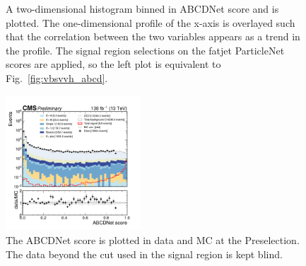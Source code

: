 \begin{figure}[htb]
    \centering
    \qquad
    \caption{
        A two-dimensional histogram binned in ABCDNet score and \detajj is plotted. 
        The one-dimensional profile of the x-axis is overlayed such that the correlation between the two variables appears as a trend in the profile. 
        The signal region selections on the fatjet ParticleNet scores are applied, so the left plot is equivalent to Fig.~\ref{fig:vbsvvh_abcd}.
    }
    \label{fig:vbsvvh_abcdnet_decorr}
\end{figure}

\begin{figure}[htb]
    \centering
    \includegraphics[width=0.45\textwidth]{fig/vbsvvh/abcdnet_score_data_vs_mc_log_presel.pdf}
    \caption{
        The ABCDNet score is plotted in data and MC at the Preselection. 
        The data beyond the cut used in the signal region is kept blind. 
    }
    \label{fig:vbsvvh_abcdnet_score}
\end{figure}


